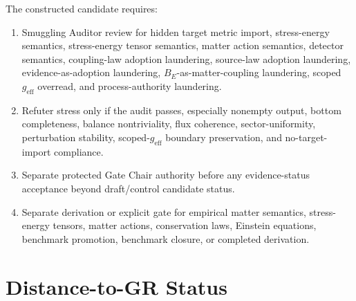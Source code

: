 \documentclass[11pt]{article}
\newcommand{\geff}{g_{\mathrm{eff}}}
\begin{document}
The constructed candidate requires:
\begin{enumerate}[leftmargin=*]
  \item Smuggling Auditor review for hidden target metric import,
  stress-energy semantics, stress-energy tensor semantics, matter action
  semantics, detector semantics, coupling-law adoption laundering,
  source-law adoption laundering, evidence-as-adoption laundering,
  \(B_E\)-as-matter-coupling laundering, scoped \(\geff\) overread, and
  process-authority laundering.
  \item Refuter stress only if the audit passes, especially nonempty output,
  bottom completeness, balance nontriviality, flux coherence,
  sector-uniformity, perturbation stability, scoped-\(\geff\) boundary
  preservation, and no-target-import compliance.
  \item Separate protected Gate Chair authority before any evidence-status
  acceptance beyond draft/control candidate status.
  \item Separate derivation or explicit gate for empirical matter semantics,
  stress-energy tensors, matter actions, conservation laws, Einstein
  equations, benchmark promotion, benchmark closure, or completed derivation.
\end{enumerate}

\section{Distance-to-GR Status}
\end{document}
